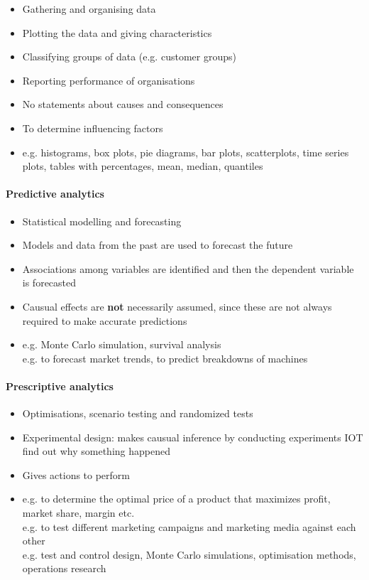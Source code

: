 \documentclass[a4paper, landscape, 6pt, fleqn]{scrartcl}
\renewcommand{\emph}[1]{\textbf{#1}}
\begin{document}
\begin{multicols*}{4}
\begin{itemize}
\item Gathering and organising data
\item Plotting the data and giving characteristics
\item Classifying groups of data (e.g. customer groups)
\item Reporting performance of organisations
\item No statements about causes and consequences
\item To determine influencing factors
\item e.g. histograms, box plots, pie diagrams, bar plots, scatterplots, time series plots, tables with percentages, mean, median, quantiles
\end{itemize}

\paragraph{Predictive analytics}

\begin{itemize}
\item Statistical modelling and forecasting
\item Models and data from the past are used to forecast the future
\item Associations among variables are identified and then the dependent variable is forecasted
\item Causual effects are \emph{not} necessarily assumed, since these are not always required to make accurate predictions
\item e.g. Monte Carlo simulation, survival analysis \\
e.g. to forecast market trends, to predict breakdowns of machines
\end{itemize}

\paragraph{Prescriptive analytics}

\begin{itemize}
\item Optimisations, scenario testing and randomized tests
\item Experimental design: makes causual inference by conducting experiments IOT find out why something happened
\item Gives actions to perform
\item e.g. to determine the optimal price of a product that maximizes profit, market share, margin etc.\\
e.g. to test different marketing campaigns and marketing media against each other \\
e.g. test and control design, Monte Carlo simulations, optimisation methods, operations research
\end{itemize}


\end{multicols*}
\end{document}
